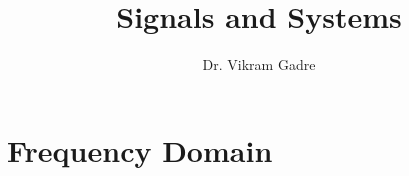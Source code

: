 \documentclass{scrbook}
\title{\Huge Signals and Systems}
\author{\Large Dr. Vikram Gadre}
\newcommand{\blankpage}{\newpage\hbox{}\thispagestyle{empty}\newpage}
\begin{document}
\frontmatter

\maketitle

\begin{comment}
\newpage
\begin{fullwidth}
~\vfill
\thispagestyle{empty}
\setlength{\parindent}{0pt}
\setlength{\parskip}{\baselineskip}
Copyright \copyright\ \the\year\ \thanklessauthor

\par\smallcaps{Published by \thanklesspublisher}

\par\smallcaps{tufte-latex.googlecode.com}

\par Licensed under the Apache License, Version 2.0 (the ``License''); you may not
use this file except in compliance with the License. You may obtain a copy
of the License at \url{http://www.apache.org/licenses/LICENSE-2.0}. Unless
required by applicable law or agreed to in writing, software distributed
under the License is distributed on an \smallcaps{``AS IS'' BASIS, WITHOUT
WARRANTIES OR CONDITIONS OF ANY KIND}, either express or implied. See the
License for the specific language governing permissions and limitations
under the License.\index{license}

\end{fullwidth}
\end{comment}
\tableofcontents

\listoffigures

\listoftables

\begin{comment}
\cleardoublepage
~\vfill
\begin{doublespace}
\noindent\fontsize{18}{22}\selectfont\itshape
\nohyphenation
Dedicated to those who appreciate \LaTeX{} 
and the work of \mbox{Edward R.~Tufte} 
and \mbox{Donald E.~Knuth}.
\end{doublespace}
\vfill
\vfill
\end{comment}

\cleardoublepage
\mainmatter
\part{Frequency Domain}
\end{document}

